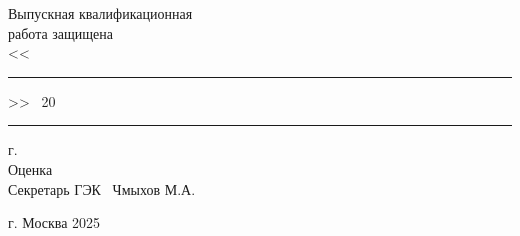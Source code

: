 \begin{titlepage}
    \hfill \begin{minipage}[t]{75mm}
               Выпускная квалификационная\\
               работа защищена\\
               <<\rule[0mm]{0.8cm}{0.1mm}>> \hrulefill \ 20\rule[0mm]{0.4cm}{0.1mm} г.\\
               Оценка \hrulefill\\
               Секретарь ГЭК \hrulefill \ Чмыхов М.А.
    \end{minipage}

    \vspace{\fill}

    \begin{center}
        г. Москва 2025
    \end{center}
\end{titlepage}